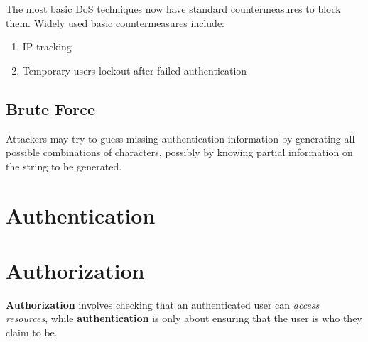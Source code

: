 The most basic DoS techniques now have standard countermeasures to block them.
Widely used basic countermeasures include:
\begin{enumerate}
   \item IP tracking
   \item Temporary users lockout after failed authentication
\end{enumerate}

\subsection{Brute Force}
Attackers may try to guess missing authentication information by generating all possible combinations of characters,
possibly by knowing partial information on the string to be generated.


\section{Authentication}
\label{sec:authentication}

\section{Authorization}
\label{sec:authorization}
\textbf{Authorization} involves checking that an authenticated user can \textit{access resources},
while \textbf{authentication} is only about ensuring that the user is who they claim to be.

